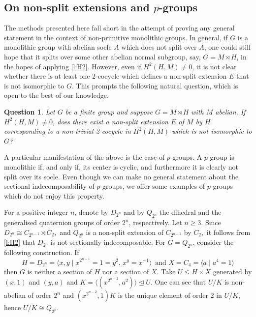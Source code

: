 \documentclass[a4paper,10pt]{amsart}
\theoremstyle{plain}
\newtheorem{question}[thm]{Question}
\theoremstyle{definition}
\begin{document}
\subsection{On non-split extensions and $p$-groups}\label{pgruppi}

The methods presented here fall short in the attempt of proving any general statement in the context of non-primitive monolithic groups. In general, if $G$ is a monolithic group with abelian socle $A$ which does not split over $A$, one could still hope that it splits over some other abelian normal subgroup, say, $G=M \rtimes H$, in the hopes of applying \cref{l:H2}. However, even if $H^2(H,M) \neq 0$, it is not clear whether there is at least one 2-cocycle which defines a non-split extension $E$ that is not isomorphic to $G$. This prompts the following natural question, which is open to the best of our knowledge.


\begin{question}\label{q:H2}
    Let $G$ be a finite group and suppose $G=M \rtimes H$ with $M$ abelian. If $H^2(H,M) \neq 0$, does there exist a non-split extension $E$ of $M$ by $H$ corresponding to a non-trivial 2-cocycle in $H^2(H,M)$ which is not isomorphic to $G$?
\end{question}

A particular manifestation of the above is the case of $p$-groups. A $p$-group is monolithic if, and only if, its center is cyclic, and furthermore it is clearly not split over its socle. Even though we can make no general statement about the sectional indecomposability of $p$-groups, we offer some examples of $p$-groups which do not enjoy this property.

For a positive integer $n$, denote by $D_{2^n}$ and by $Q_{2^n}$ the dihedral and the generalised quaternion groups of order $2^n$, respectively. Let $n \geq 3$. Since $D_{2^n}\cong C_{2^{n-1}}\rtimes C_2,$ and $Q_{2^n}$ is a non-split extension of $C_{2^{n-1}}$ by $C_2,$ it follows from \cref{l:H2} that $D_{2^n}$ is not sectionally indecomposable.
For $G=Q_{2^n}$, consider the following construction. If
\[H=D_{2^n}=\langle x,y \mid x^{2^{n-1}}=1=y^2,\, x^y=x^{-1}\rangle\,\text{ and }
X=C_4=\langle a \mid a^4=1\rangle\]
then $G$ is neither a section of $H$ nor a section of $X.$ Take $U \leq H \times X$ generated by $(x,1)$ and $(y,a)$ and $K=\langle (x^{2^{n-2}},a^2)\rangle \unlhd U$. One can see that $U/K$ is non-abelian of order $2^n$ and $(x^{2^{n-2}},1)K$ is the unique element of order 2 in $U/K$, hence $U/K \cong Q_{2^n}.$
\end{document}

